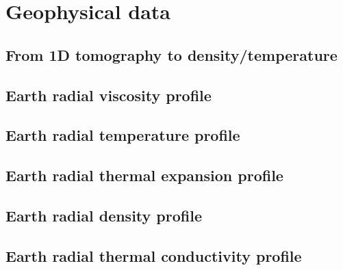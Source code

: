 \chapter{Geophysical data} 

\newpage %
\section{From 1D tomography to density/temperature}  %
\newpage %
\section{Earth radial viscosity profile \label{ss:viscprof}}  %
\newpage %
\section{Earth radial temperature profile \label{ss:adiab}}  %
\newpage %
\section{Earth radial thermal expansion profile}  %
\newpage %
\section{Earth radial density profile}  %
\newpage %
\section{Earth radial thermal conductivity profile}  %
